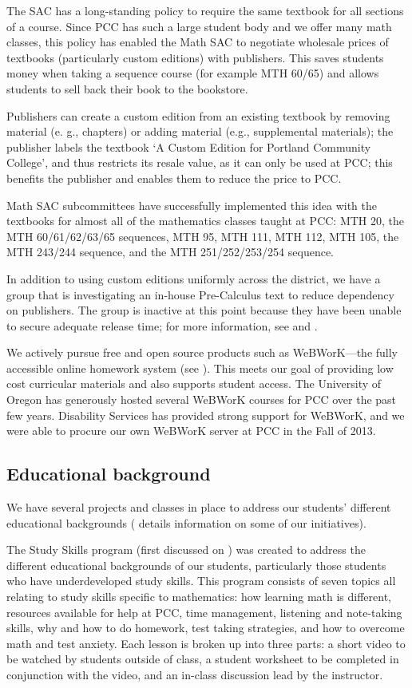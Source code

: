 The SAC has a long-standing policy to require the same textbook for all sections of a course.
Since PCC has such a large student body and we offer many math classes, this policy has enabled the Math SAC to negotiate wholesale prices of textbooks (particularly custom editions) with publishers.
This saves students money when taking a sequence course (for example MTH 60/65) and allows students to sell back their book to the bookstore.

Publishers can create a custom edition from an existing textbook by removing material (e.
g., chapters) or adding material (e.g., supplemental materials);
the publisher labels the textbook `A Custom Edition for Portland Community
College', and thus restricts its resale value, as it can only be used at PCC;
this benefits the publisher and enables them to reduce the price to PCC.

Math SAC subcommittees have successfully implemented this idea with the textbooks for almost all of the mathematics classes taught at PCC: MTH 20, the MTH 60/61/62/63/65 sequences, MTH 95, MTH 111, MTH 112, MTH 105, the MTH 243/244 sequence, and the MTH 251/252/253/254 sequence.

In addition to using custom editions uniformly across the district, we have a group that is investigating an in-house Pre-Calculus text to reduce dependency on publishers.
The group is inactive at this point because they have been unable to secure adequate release time; for more information, see  and \cite{mth111project}.

We actively pursue free and open source products such as WeBWorK---the fully accessible online homework system (see ).
This meets our goal of providing low cost curricular materials and also supports student access.
The University of Oregon has generously hosted several WeBWorK courses for PCC over the past few years.
Disability Services has provided strong support for WeBWorK, and we were able to procure our own WeBWorK server at PCC in the Fall of 2013.

\subsection{Educational background}
We have several projects and classes in place to address our students' different educational backgrounds ( details information on some of our initiatives).

The Study Skills program (first discussed on ) was created to address the different educational backgrounds of our students, particularly those students who have underdeveloped study skills.
This program consists of seven topics all relating to study skills specific to mathematics: how learning math is different, resources available for help at PCC, time management, listening and note-taking skills, why and how to do homework, test taking strategies, and how to overcome math and test anxiety.
Each lesson is broken up into three parts: a short video to be watched by students outside of class, a student worksheet to be completed in conjunction with the video, and an in-class discussion lead by the instructor.

